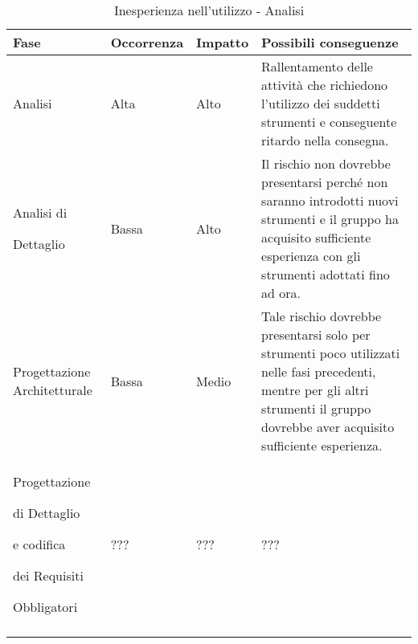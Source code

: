 \documentclass[../PianoProgetto.tex]{subfiles}
\begin{document}
	\hspace{0pt}
		\begin{longtabu} to \textwidth {X[.55] X[c .50] X[c .50] X}
			\toprule
			\textbf{Fase} & \textbf{Occorrenza} & \textbf{Impatto} & \textbf{Possibili conseguenze}\\
			\midrule
			\endhead
			
			Analisi & Alta & Alto & Rallentamento delle attività che richiedono l'utilizzo dei suddetti strumenti e conseguente ritardo nella consegna. \\
			\midrule
			Analisi di \par Dettaglio & Bassa & Alto & Il rischio non dovrebbe presentarsi perché non saranno introdotti nuovi strumenti e il gruppo ha acquisito sufficiente esperienza con gli strumenti adottati fino ad ora. \\
			\midrule
			Progettazione Architetturale & Bassa &  Medio & Tale rischio dovrebbe presentarsi solo per strumenti poco utilizzati nelle fasi precedenti, mentre per gli altri strumenti il gruppo dovrebbe aver acquisito sufficiente esperienza. \\
			\midrule
			Progettazione \par di Dettaglio \par e codifica \par dei Requisiti \par Obbligatori & ??? & ??? & ??? \\
			\bottomrule
			
			\caption{Inesperienza nell'utilizzo - Analisi}
			\label{tab:Inesperienza nell'utilizzo - Analisi}	
		\end{longtabu}
			
\end{document}
